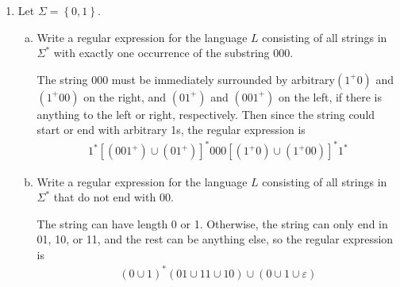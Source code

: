 \documentclass{article}
\begin{document}
\begin{enumerate}
\begin{proof}
			If $w\in\text{NOEXTEND}(A),$ then $w\in A$ so $w$ is a path to some state in $F,$ and this state is in $F'$ because $w$ is not the proper prefix of any other accepted string.

			Conversely, if $w$ is accepted by $N,$ it by construction it must have been accepted by $M$, so $w\in A,$ and $w$ is only accepted if there is no path to another state in $F,$ so if $w$ is not the proper prefix of a string in $A.$ Thus, $N$ recognizes NOEXTEND$(A),$ so it is regular.
		\end{proof}

		\newpage
	\item Let $\Sigma=\left\{ 0, 1 \right\}.$
		\begin{enumerate}[(a)]
			\item Write a regular expression for the language $L$ consisting of all strings in $\Sigma^*$ with exactly one occurrence of the substring 000.
				\begin{soln}
					The string 000 must be immediately surrounded by arbitrary$(1^+0)$ and $(1^+00)$ on the right, and $(01^+)$ and $(001^+)$ on the left, if there is anything to the left or right, respectively. Then since the string could start or end with arbitrary 1s, the regular expression is
					\begin{align*}
						1^*\left[ (001^+)\cup(01^+) \right]^*000\left[ (1^+0)\cup(1^+00) \right]^*1^*
					\end{align*}
				\end{soln}

			\item Write a regular expression for the language $L$ consisting of all strings in $\Sigma^*$ that do not end with 00.
				\begin{soln}
					The string can have length 0 or 1. Otherwise, the string can only end in 01, 10, or 11, and the rest can be anything else, so the regular expression is
					\begin{align*}
						(0\cup 1)^* (01\cup 11\cup 10)\cup(0\cup1\cup\varepsilon)
					\end{align*}
				\end{soln}

		\end{enumerate}

\end{enumerate}
\end{document}
